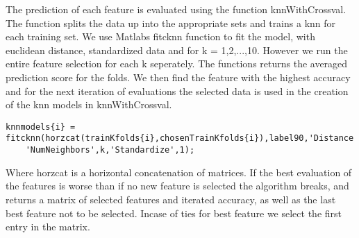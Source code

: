 The prediction of each feature is evaluated using the function knnWithCrossval. The function splits the data up into the appropriate sets and trains a knn for each training set. We use Matlabs fitcknn function to fit the model, with euclidean distance, standardized data and for k = 1,2,...,10. However we run the entire feature selection for each k seperately. The functions returns the averaged prediction score for the folds.
We then find the feature with the highest accuracy and for the next iteration of evaluations the selected data is used in the creation of the knn models in knnWithCrossval.
\begin{lstlisting}[mathescape=true]
    knnmodels{i} = fitcknn(horzcat(trainKfolds{i},chosenTrainKfolds{i}),label90,'Distance','euclidean',...
    'NumNeighbors',k,'Standardize',1);
\end{lstlisting}
Where horzcat is a horizontal concatenation of matrices.
If the best evaluation of the features is worse than if no new feature is selected the algorithm breaks, and returns a matrix of selected features and iterated accuracy, as well as the last best feature not to be selected.
Incase of ties for best feature we select the first entry in the matrix.

